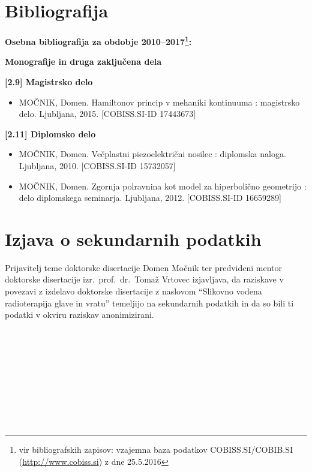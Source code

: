 \documentclass[a4paper,twoside,11pt]{article}
\begin{document}
	\section{Bibliografija}
	\par{\noindent
		\textbf{Osebna bibliografija za obdobje 2010--2017\footnote{vir bibliografskih zapisov: vzajemna baza podatkov COBISS.SI/COBIB.SI (\href{http://www.cobiss.si}{http://www.cobiss.si}) z dne 25.5.2016}: \\}
		\par{\noindent \textbf{Monografije in druga zaključena dela} \\}
		\vspace{-0.3cm}
		\par{\noindent \textbf{[2.9] Magistrsko delo}}
		\begin{itemize}[align=right, itemsep=-0.05cm]
			\item[1.] MOČNIK, Domen. Hamiltonov princip v mehaniki kontinuuma : magistrsko delo. Ljubljana, 2015. [COBISS.SI-ID 17443673]
		\end{itemize}
		\par{\noindent \textbf{[2.11] Diplomsko delo}}
		\begin{itemize}[align=right, itemsep=-0.05cm]
			\item[2.] MOČNIK, Domen. Večplastni piezoelektrični nosilec : diplomska naloga. Ljubljana, 2010. [COBISS.SI-ID 15732057]
			\item[3.] MOČNIK, Domen. Zgornja polravnina kot model za hiperbolično geometrijo : delo diplomskega seminarja. Ljubljana, 2012. [COBISS.SI-ID 16659289]
		\end{itemize}

		\newpage
		\section{Izjava o sekundarnih podatkih}
		\par{		
		Prijavitelj teme doktorske disertacije Domen Močnik ter predvideni mentor doktorske disertacije izr.\ prof.\ dr.\ Tomaž Vrtovec izjavljava, da raziskave v povezavi z izdelavo doktorske disertacije z naslovom ``Slikovno vodena radioterapija glave in vratu'' temeljijo na sekundarnih podatkih in da so bili ti podatki v okviru raziskav anonimizirani.
		}
		\\\\\\
		\noindent{}
		\\\\\\
		\noindent{} \hfill{}
		\\\\\\
		\noindent{} \hfill{}\\
		
}
\end{document}

